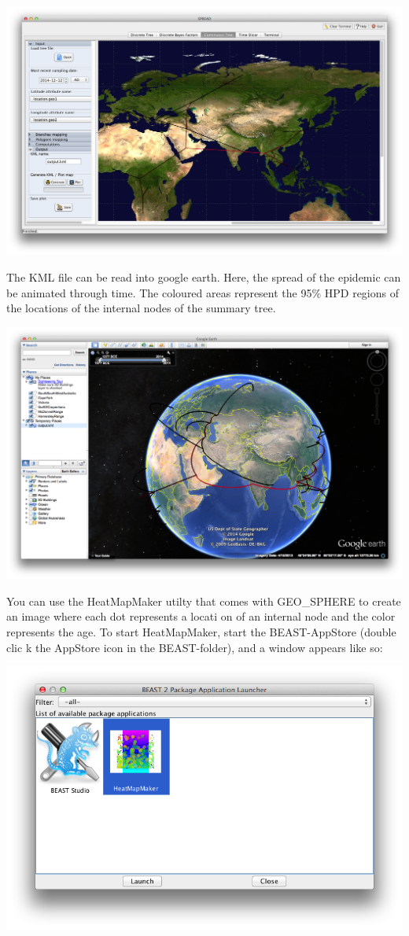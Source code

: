 \documentclass{article}
\begin{document}
\includegraphics[width=\textwidth]{figures/spread.png}

The KML file can be read into google earth. Here, the spread of the epidemic can be animated through time. The coloured areas represent the 95\% HPD regions of the locations of the internal nodes of the summary tree.

\includegraphics[width=\textwidth]{figures/google-earth.png}


You can use the HeatMapMaker utilty that comes with GEO\_SPHERE to create an image where each dot represents a locati
on of an internal node and the color represents the age. To start HeatMapMaker, start the BEAST-AppStore (double clic
k the AppStore icon in the BEAST-folder), and a window appears like so:

\includegraphics[scale=0.4]{figures/AppStore}
\end{document}
